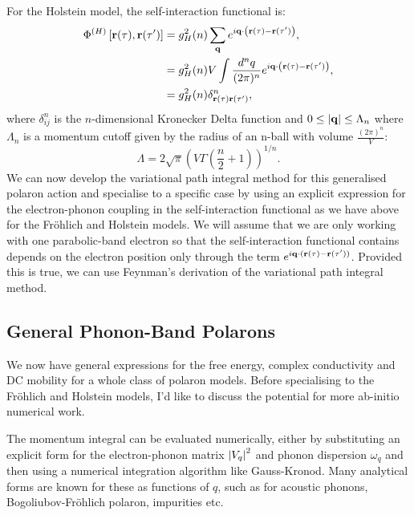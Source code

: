 For the Holstein model, the self-interaction functional is:
\begin{equation}
    \begin{aligned}
        \Phi^{(H)}\left[\vb{r}(\tau), \vb{r}(\tau')\right] &= g_H^2(n) \sum_{\vb{q}} e^{i \vb{q} \cdot \left(\vb{r}(\tau) - \vb{r}(\tau') \right)} ,\\
        &= g_{H}^2(n) V \int \frac{d^n q}{(2\pi)^n} e^{i\vb{q}\cdot\left(\vb{r}(\tau) - \vb{r}(\tau')\right)}, \\
        &= g_H^2(n) \delta^n_{\vb{r}(\tau)\vb{r}(\tau')} ,
    \end{aligned}
\end{equation}
where $\delta^n_{ij}$ is the $n$-dimensional Kronecker Delta function and $0 \leq \abs{\vb{q}} \leq \Lambda_n$ where $\Lambda_n$ is a momentum cutoff given by the radius of an n-ball with volume $\frac{(2\pi)^n}{V}$:
\begin{equation}
    \Lambda = 2\sqrt{\pi} \left(V \Gamma\left(\frac{n}{2} + 1\right)\right)^{1/n}.
\end{equation}
We can now develop the variational path integral method for this generalised polaron action and specialise to a specific case by using an explicit expression for the electron-phonon coupling in the self-interaction functional as we have above for the Fr\"ohlich and Holstein models. We will assume that we are only working with one parabolic-band electron so that the self-interaction functional contains depends on the electron position only through the term $e^{i \vb{q} \cdot (\vb{r}(\tau) - \vb{r}(\tau'))}$. Provided this is true, we can use Feynman's derivation of the variational path integral method.

\subsection{General Phonon-Band Polarons}

We now have general expressions for the free energy, complex conductivity and DC mobility for a whole class of polaron models. Before specialising to the Fr\"ohlich and Holstein models, I'd like to discuss the potential for more ab-initio numerical work. 
\newline

The momentum integral can be evaluated numerically, either by substituting an explicit form for the electron-phonon matrix $\abs{V_q}^2$ and phonon dispersion $\omega_q$ and then using a numerical integration algorithm like Gauss-Kronod. Many analytical forms are known for these as functions of $q$, such as for acoustic phonons, Bogoliubov-Fröhlich polaron, impurities etc.
\newline 

